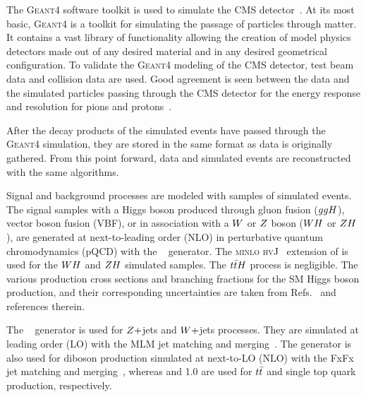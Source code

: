 The \textsc{Geant4} software toolkit is used to simulate the CMS 
detector~\cite{Agostinelli:2002hh}. At its most basic, \textsc{Geant4} is a 
toolkit for simulating the passage of particles through matter. It contains a 
vast library of functionality allowing the creation of model physics detectors
made out of any desired material and in any desired geometrical configuration.
To validate the \textsc{Geant4} modeling of the CMS detector, test beam data and
collision data are used. Good agreement is seen between the data and the
simulated particles passing through the CMS detector for the energy response
and resolution for pions and protons~\cite{geant4_cms_2017}.

After the decay products of the simulated events have passed through the \textsc{Geant4}
simulation, they are stored in the same format as data is originally gathered. From
this point forward, data and simulated events are reconstructed with the same 
algorithms.




Signal and background processes are modeled with samples of simulated events.
The signal samples with a Higgs boson produced through gluon fusion ($ggH$), vector boson fusion (VBF),
or in association with a $W$ or $Z$ boson ($WH$ or $ZH$), are generated at next-to-leading order (NLO) in perturbative quantum chromodynamics (pQCD) with the ~\cite{Nason:2004rx,Frixione:2007vw, Alioli:2010xd, Alioli:2010xa, Alioli:2008tz} generator. The \textsc{minlo hvJ}~\cite{Luisoni:2013kna} extension of  is used for the $WH$ and $ZH$ simulated samples. 
The $t\bar{t}H$ process is negligible.
The various production cross sections and branching fractions for the SM Higgs boson production, and their corresponding uncertainties are taken from Refs.~\cite{deFlorian:2016spz,Denner:2011mq,Ball:2011mu} and references therein.

The \aMCATNLO~\cite{Alwall:2014hca} generator is used for $Z+$jets and $W+$jets processes. They are simulated at leading order (LO) with the MLM jet matching and merging~\cite{Alwall:2007fs}.
The \aMCATNLO generator is also used for diboson production simulated at next-to-LO (NLO) with the FxFx jet matching and merging~\cite{Frederix:2012ps}, whereas  and 1.0 are used for $t\bar{t}$ and single top quark production, respectively.



